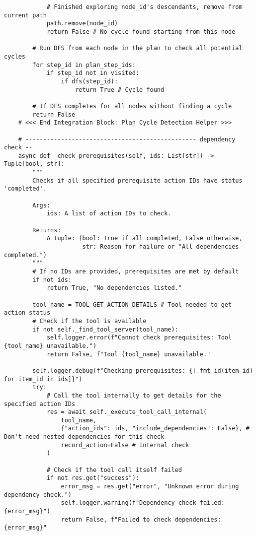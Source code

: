 \documentclass[12pt,a4paper]{article}
\begin{document}
\begin{pageablecode}
\begin{verbatim}
            # Finished exploring node_id's descendants, remove from current path
            path.remove(node_id)
            return False # No cycle found starting from this node

        # Run DFS from each node in the plan to check all potential cycles
        for step_id in plan_step_ids:
            if step_id not in visited:
                if dfs(step_id):
                    return True # Cycle found

        # If DFS completes for all nodes without finding a cycle
        return False
    # <<< End Integration Block: Plan Cycle Detection Helper >>>

    # ------------------------------------------------ dependency check --
    async def _check_prerequisites(self, ids: List[str]) -> Tuple[bool, str]:
        """
        Checks if all specified prerequisite action IDs have status 'completed'.

        Args:
            ids: A list of action IDs to check.

        Returns:
            A tuple: (bool: True if all completed, False otherwise,
                      str: Reason for failure or "All dependencies completed.")
        """
        # If no IDs are provided, prerequisites are met by default
        if not ids:
            return True, "No dependencies listed."

        tool_name = TOOL_GET_ACTION_DETAILS # Tool needed to get action status
        # Check if the tool is available
        if not self._find_tool_server(tool_name):
            self.logger.error(f"Cannot check prerequisites: Tool {tool_name} unavailable.")
            return False, f"Tool {tool_name} unavailable."

        self.logger.debug(f"Checking prerequisites: {[_fmt_id(item_id) for item_id in ids]}")
        try:
            # Call the tool internally to get details for the specified action IDs
            res = await self._execute_tool_call_internal(
                tool_name,
                {"action_ids": ids, "include_dependencies": False}, # Don't need nested dependencies for this check
                record_action=False # Internal check
            )

            # Check if the tool call itself failed
            if not res.get("success"):
                error_msg = res.get("error", "Unknown error during dependency check.")
                self.logger.warning(f"Dependency check failed: {error_msg}")
                return False, f"Failed to check dependencies: {error_msg}"


\end{verbatim}
\end{pageablecode}
\end{document}
